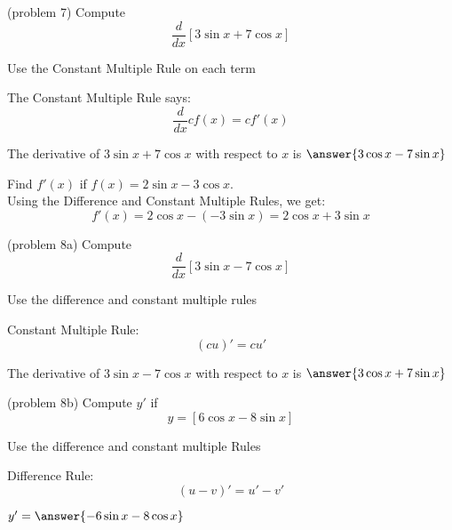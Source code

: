 \documentclass[handout]{ximera}
\begin{document}
\begin{problem}(problem 7)
  Compute 
  \[
  \frac{d}{dx} \left[3\sin x + 7\cos x\right]
  \]
  
		\begin{hint}
      Use the Constant Multiple Rule on each term
    \end{hint}
    \begin{hint}
      The Constant Multiple Rule says:
      \[
      \frac{d}{dx} cf(x) = cf'(x)
      \]
    \end{hint}    
		The derivative of $3\sin x + 7\cos x$ with respect to $x$ is
		 $\answer{3\cos x - 7\sin x}$
	
\end{problem}


\begin{example}[example 8]
 Find $f'(x)$ if  $f(x) = 2\sin x - 3\cos x.$\\
 Using the Difference and Constant Multiple Rules, we get:
 \[
 f'(x) = 2\cos x - (-3\sin x) = 2\cos x + 3\sin x
 \]
\end{example}


\begin{problem}(problem 8a)
  Compute 
  \[
  \frac{d}{dx} \left[3\sin x - 7\cos x\right]
  \]
  
		\begin{hint}
      Use the difference and constant multiple rules
    \end{hint}
    \begin{hint}
      Constant Multiple Rule:
      \[
      (cu)' = cu'
      \]
    \end{hint}    
		The derivative of $3\sin x - 7\cos x$ with respect to $x$ is
		 $\answer{3\cos x + 7\sin x}$
	
\end{problem}

\begin{problem}(problem 8b)
  Compute $y'$ if
  \[
  y= \left[6\cos x - 8\sin x\right]
  \]
  
		\begin{hint}
      Use the difference and constant multiple Rules
    \end{hint}
    \begin{hint}
      Difference Rule:
      \[
      (u-v)' = u' - v'
      \]
    \end{hint}    
		
  $y' = \answer{-6\sin x - 8\cos x}$
	
\end{problem}
\end{document}
